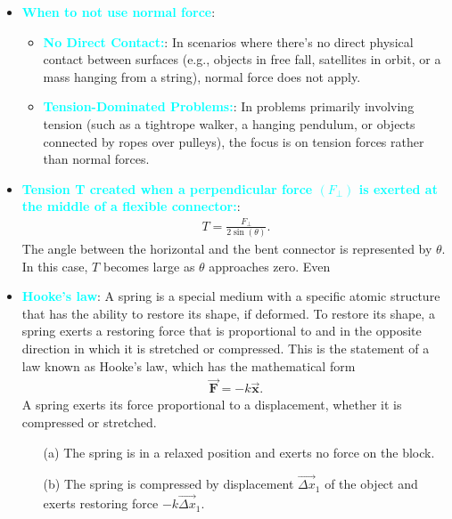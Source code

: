 \documentclass{report}
\begin{document}
\begin{itemize}
\begin{itemize}
                \end{itemize}
            \item \textbf{\textcolor{cyan}{When to not use normal force}}:
                \begin{itemize}
                    \item \textbf{\textcolor{cyan}{No Direct Contact:}}: In scenarios where there's no direct physical contact between surfaces (e.g., objects in free fall, satellites in orbit, or a mass hanging from a string), normal force does not apply.
                    \item \textbf{\textcolor{cyan}{Tension-Dominated Problems:}}: In problems primarily involving tension (such as a tightrope walker, a hanging pendulum, or objects connected by ropes over pulleys), the focus is on tension forces rather than normal forces.
                \end{itemize}
        \item \textbf{\textcolor{cyan}{Tension T created when a perpendicular force  $(F_{\perp})$ is exerted at the middle of a flexible connector:}}:
            \begin{align*}
                T=\frac{F_{\perp}}{2\sin{\left(\theta \right)}}
            .\end{align*}
            The angle between the horizontal and the bent connector is represented by $\theta$. In this case, $T$ becomes large as $\theta$ approaches zero. Even
        \item \textbf{\textcolor{cyan}{Hooke’s law}}: A spring is a special medium with a specific atomic structure that has the ability to restore its shape, if deformed. To restore its shape, a spring exerts a restoring force that is proportional to and in the opposite direction in which it is stretched or compressed. This is the statement of a law known as Hooke’s law, which has the mathematical form
            \begin{align*}
                \vec{\mathbf{F}} = -k\vec{\mathbf{x}}
            .\end{align*}
            \bigbreak \noindent 
                A spring exerts its force proportional to a displacement, whether it is compressed or stretched.
            \begin{enumerate}
                \item[(a)] The spring is in a relaxed position and exerts no force on the block.
                \item[(b)] The spring is compressed by displacement $\vec{\Delta x}_1$ of the object and exerts restoring force $-k\vec{\Delta x}_1$.

\end{enumerate}
\end{itemize}
\end{document}
